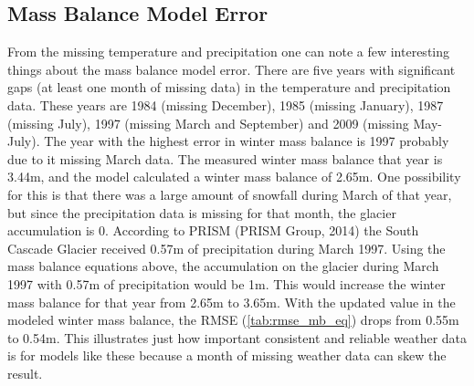 \documentclass{article}
\begin{document}
\subsection{Mass Balance Model Error}
From the missing temperature and precipitation one can note a few interesting things about the mass balance model error. There are five years 
with significant gaps (at least one month of missing data) in the temperature and precipitation data. These years are 1984 (missing December), 
1985 (missing January), 1987 (missing July), 1997 (missing March and September) and 2009 (missing May-July). The year with the highest error in 
winter mass balance is 1997 probably due to it missing March data. The measured winter mass balance that year is 3.44m, and the model calculated a 
winter mass balance of 2.65m. One possibility for this is that there was a large amount of snowfall during March of that year, but since the 
precipitation data is missing for that month, the glacier accumulation is 0. According to PRISM (PRISM Group, 2014) the South Cascade Glacier received 0.57m 
of precipitation during March 1997. Using the mass balance equations above, the accumulation on the glacier during March 1997 with 0.57m of 
precipitation would be 1m. This would increase the winter mass balance for that year from 2.65m to 3.65m. With the updated value in the modeled winter 
mass balance, the RMSE (\ref{tab:rmse_mb_eq}) drops from 0.55m to 0.54m. This 
illustrates just how important consistent and reliable weather data is for models like these because a month of missing weather data can skew the 
result.
\end{document}

